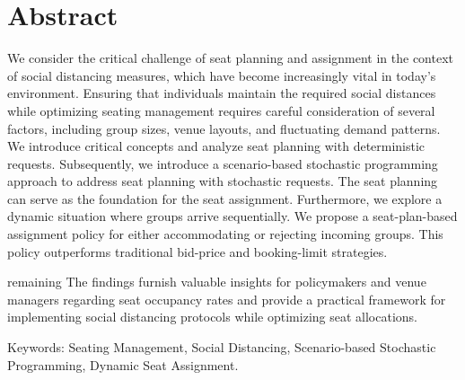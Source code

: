 
\section*{Abstract}
We consider the critical challenge of seat planning and assignment in the context of social distancing measures, which have become increasingly vital in today's environment. Ensuring that individuals maintain the required social distances while optimizing seating management requires careful consideration of several factors, including group sizes, venue layouts, and fluctuating demand patterns. We introduce critical concepts and analyze seat planning with deterministic requests. Subsequently, we introduce a scenario-based stochastic programming approach to address seat planning with stochastic requests. The seat planning can serve as the foundation for the seat assignment. Furthermore, we explore a dynamic situation where groups arrive sequentially. We propose a seat-plan-based assignment policy for either accommodating or rejecting incoming groups. This policy outperforms traditional bid-price and booking-limit strategies. 


{\color{blue} remaining}
The findings furnish valuable insights for policymakers and venue managers regarding seat occupancy rates and provide a practical framework for implementing social distancing protocols while optimizing seat allocations.



Keywords: Seating Management, Social Distancing, Scenario-based Stochastic Programming, Dynamic Seat Assignment.


